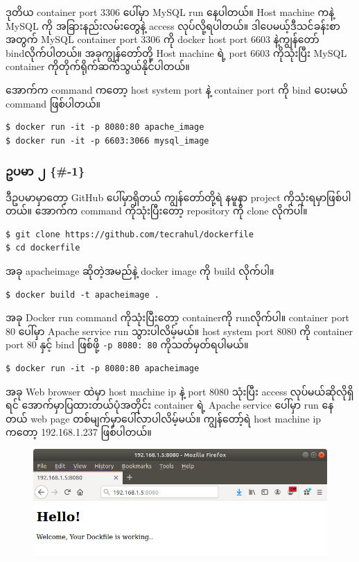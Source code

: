 \documentclass{article}
\begin{document}
ဒုတိယ container port 3306 ပေါ်မှာ MySQL run နေပါတယ်။ Host machine ကနဲ့
MySQL ကို အခြားနည်းလမ်းတွေနဲ့ access လုပ်လို့ရပါတယ်။
ဒါပေမယ့်ဒီသင်ခန်းစာအတွက် MySQL container port 3306 ကို docker host port
6603 နဲ့ကျွန်တော် bindလိုက်ပါတယ်။ အခုကျွန်တော်တို့ Host machine ရဲ့ port
6603 ကိုသုံးပြီး MySQL container ကိုတိုက်ရိုက်ဆက်သွယ်နိုင်ပါတယ်။

အောက်က command ကတော့ host system port နဲ့ container port ကို bind ပေးမယ်
command ဖြစ်ပါတယ်။

\begin{verbatim}
$ docker run -it -p 8080:80 apache_image
$ docker run -it -p 6603:3066 mysql_image
\end{verbatim}

\subsubsection{ဥပမာ ၂ \{\#-1\}}\label{ux1025ux1015ux1019--1}

ဒီဥပမာမှာတော့ GitHub ပေါ်မှာရှိတယ် ကျွန်တော်တို့ရဲ နမူနာ project
ကိုသုံးရမှာဖြစ်ပါတယ်။ အောက်က command ကိုသုံးပြီးတော့ repository ကို
clone လိုက်ပါ။

\begin{verbatim}
$ git clone https://github.com/tecrahul/dockerfile
$ cd dockerfile
\end{verbatim}

အခု apacheimage ဆိုတဲ့အမည်နဲ့ docker image ကို build လိုက်ပါ။

\begin{verbatim}
$ docker build -t apacheimage .
\end{verbatim}

အခု Docker run command ကိုသုံးပြီး‌တော့ containerကို runလိုက်ပါ။
container port 80 ပေါ်မှာ Apache service run သွားပါလိမ့်မယ်။ host system
port 8080 ကို container port 80 နှင့် bind ဖြစ်ဖို့ \texttt{-p 8080: 80}
ကိုသတ်မှတ်ရပါမယ်။

\begin{verbatim}
$ docker run -it -p 8080:80 apacheimage
\end{verbatim}

အခု Web browser ထဲမှာ host machine ip နဲ့ port 8080 သုံးပြီး access
လုပ်မယ်ဆိုလိုရှိရင် အောက်မှာပြထားတယ်ပုံအတိုင်း container ရဲ့ Apache
service ပေါ်မှာ run နေတယ် web page တစ်မျက်မှာပေါ်လာပါလိမ့်မယ်။
ကျွန်တော့်ရဲ host machine ip ကတော့ 192.168.1.237 ဖြစ်ပါတယ်။

\begin{figure}[htbp]
\centering
\includegraphics[width=0.70\paperwidth]{.gitbook/assets/docker_file_and_docker_port.png}
\end{figure}
\end{document}
